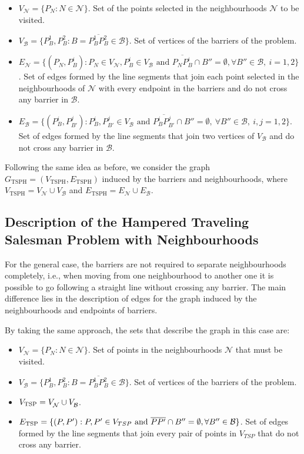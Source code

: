 \documentclass[a4paper,  review, authoryear, 1p.]{elsarticle}
\newcommand{\TSPN}{{\sf{H-TSPN}\xspace }}
\newcommand{\B}{{\mathcal B}}
\newcommand{\VB}{{V^{}_{\mathcal B}}}
\newcommand{\EB}{{E^{}_{\mathcal B}}}
\newcommand{\VN}{{V^{}_{\mathcal N}}}
\newcommand{\EN}{{E^{}_{\mathcal N}}}
\newcommand{\GTSPH}{{G_{\text{TSPH}}}}
\newcommand{\VTSPH}{{V_{\text{TSPH}}}}
\newcommand{\ETSPH}{{E_{\text{TSPH}}}}
\newcommand{\CV}[1]{{\color{red}#1}}
\begin{document}
		\begin{itemize}
			\item $\VN=\{P_N:N\in\mathcal N\}$. Set of the points selected in the neighbourhoods $\mathcal N$ to be visited.
			\item $\VB=\{P^1_B, P^2_B:B=\overline{P^1_B P^2_B}\in \mathcal B\}$. Set of vertices of the barriers of the problem.
			\item $\EN=\{(P_N, P^i_{B}):P_N\in\VN, P^i_B\in V_\B\text{ and } \overline{P_NP^i_B}\cap B''=\emptyset,\forall B''\in\B,\:i=1,2\}$. Set of edges formed by the line segments that join each point selected in the neighbourhoods of $\mathcal N$ with every endpoint in the barriers and do not cross any barrier in $\B$.
			\item $\EB=\{(P^{i}_B, P^{j}_{B'}):P^i_B, P^j_{B'}\in \VB \text{ and } \overline{P^i_B P^j_{B'}}\cap B''=\emptyset,\:\forall B''\in\mathcal B,\:i, j=1,2\}$. Set of edges formed by the line segments that join two vertices of $V_{\mathcal B}$ and do not cross any barrier in $\B$.
		\end{itemize} 
		
		Following the same idea as before, we consider the graph $\GTSPH=(\VTSPH,\ETSPH)$ induced by the barriers and neighbourhoods, where $\VTSPH=\VN\cup\VB$ and $\ETSPH=\EN\cup\EB$.
		
		
		\CV{
		\subsection{Description of the Hampered Traveling Salesman Problem with Neighbourhoods}
		For the general case, the barriers are not required to separate neighbourhoods completely, i.e., when moving from one neighbourhood to another one it is possible to go following a straight line without crossing any barrier. The main difference lies in the description of edges for the graph induced by the neighbourhoods and endpoints of barriers.}

		By taking the same approach, the sets that describe the graph in this case are:
		
		\begin{itemize}
			\item $\VN=\{P_N:N\in\mathcal N\}$. Set of points in the neighbourhoods $\mathcal N$ that must be visited.
			\item $\VB=\{P^1_B, P^2_B:B=\overline{P^1_B P^2_B}\in \mathcal B\}$. Set of vertices of the barriers of the problem.
			\item $V_{\rm TSP} = \VN \cup \VB$.
			\item $E_{\rm TSP}=\{(P, P'):P, P' \in V_{TSP} \text{ and } \overline{PP'}\cap B''=\emptyset,\forall B''\in\B\}$. Set of edges formed by the line segments that join every pair of points in $V_{TSP}$ that do not cross any barrier.
		\end{itemize} 
		
\end{document}
